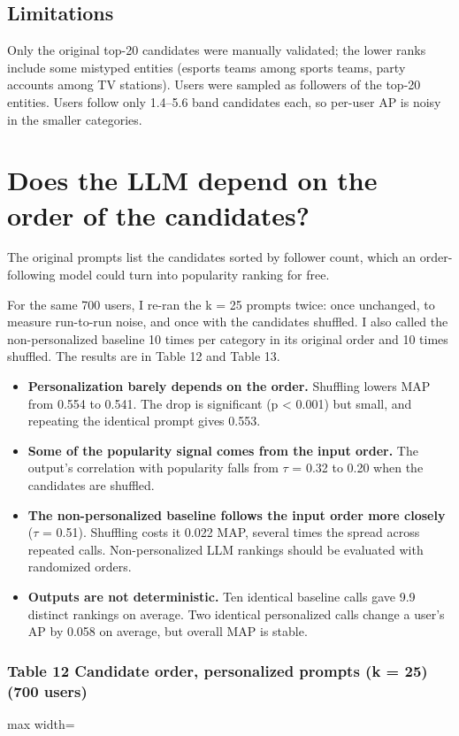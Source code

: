 \documentclass[10pt]{article}
\begin{document}
\subsection*{Limitations}
Only the original top-20 candidates were manually validated; the lower ranks include some mistyped entities (esports teams among sports teams, party accounts among TV stations). Users were sampled as followers of the top-20 entities. Users follow only 1.4--5.6 band candidates each, so per-user AP is noisy in the smaller categories.

\section{Does the LLM depend on the order of the candidates?}
The original prompts list the candidates sorted by follower count, which an order-following model could turn into popularity ranking for free.

For the same 700 users, I re-ran the k = 25 prompts twice: once unchanged, to measure run-to-run noise, and once with the candidates shuffled. I also called the non-personalized baseline 10 times per category in its original order and 10 times shuffled. The results are in Table 12 and Table 13.

\begin{itemize}
  \item \textbf{Personalization barely depends on the order.} Shuffling lowers MAP from 0.554 to 0.541. The drop is significant (p \textless{} 0.001) but small, and repeating the identical prompt gives 0.553.
  \item \textbf{Some of the popularity signal comes from the input order.} The output's correlation with popularity falls from $\tau$ = 0.32 to 0.20 when the candidates are shuffled.
  \item \textbf{The non-personalized baseline follows the input order more closely} ($\tau$ = 0.51). Shuffling costs it 0.022 MAP, several times the spread across repeated calls. Non-personalized LLM rankings should be evaluated with randomized orders.
  \item \textbf{Outputs are not deterministic.} Ten identical baseline calls gave 9.9 distinct rankings on average. Two identical personalized calls change a user's AP by 0.058 on average, but overall MAP is stable.
\end{itemize}
\subsubsection*{Table 12 \textperiodcentered{} Candidate order, personalized prompts (k = 25) (700 users)}
\begin{center}\begin{adjustbox}{max width=\linewidth}

\end{adjustbox}\end{center}
\end{document}
